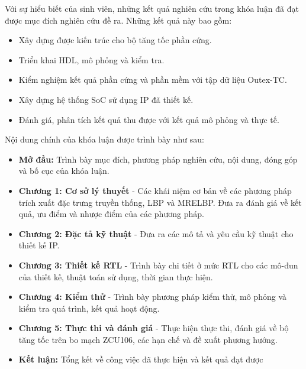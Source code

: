 Với sự hiểu biết của sinh viên, những kết quả nghiên cứu trong khóa luận đã đạt được mục đích nghiên cứu đề ra. Những kết quả này bao gồm:

\renewcommand{\labelitemi}{$-$}
\begin{itemize}
	\item Xây dựng được kiến trúc cho bộ tăng tốc phần cứng.
	\item Triển khai HDL, mô phỏng và kiểm tra.
	\item Kiểm nghiệm kết quả phần cứng và phần mềm với tập dữ liệu Outex-TC.
	\item Xây dựng hệ thống SoC sử dụng IP đã thiết kế.
	\item Đánh giá, phân tích kết quả thu được với kết quả mô phỏng và thực tế.
\end{itemize} 

\vspace{0.5cm}

Nội dung chính của khóa luận được trình bày như sau:

\renewcommand{\labelitemi}{$-$}
\begin{itemize}
	\item \textbf{Mở đầu:} Trình bày mục đích, phương pháp nghiên cứu, nội dung, đóng góp và bố cục của khóa luận.
	\item \textbf{Chương 1: Cơ sở lý thuyết} - Các khái niệm cơ bản về các phương pháp trích xuất đặc trưng truyền thống, LBP và MRELBP. Đưa ra đánh giá về kết quả, ưu điểm và nhược điểm của các phương pháp.
    \item  \textbf{Chương 2: Đặc tả kỹ thuật} - Đưa ra các mô tả và yêu cầu kỹ thuật cho thiết kế IP.
	\item  \textbf{Chương 3: Thiết kế RTL} - Trình bày chi tiết ở mức RTL cho các mô-đun của thiết kế, thuật toán sử dụng, thời gian thực hiện.
    
	\item\textbf{Chương 4: Kiểm thử} - Trình bày phương pháp kiểm thử, mô phỏng và kiểm tra quá trình, kết quả hoạt động.
	\item  \textbf{Chương 5: Thực thi và đánh giá} - Thực hiện thực thi, đánh giá về bộ tăng tốc trên bo mạch ZCU106, các hạn chế và đề xuất phương hướng. 
    \item \textbf{Kết luận: }Tổng kết về công việc đã thực hiện và kết quả đạt được
\end{itemize} 